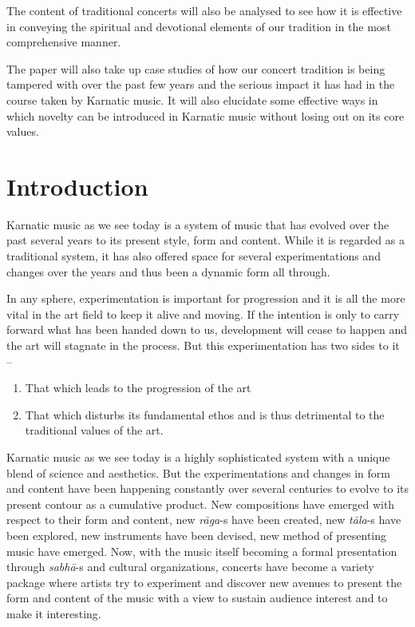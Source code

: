 The content of traditional concerts will also be analysed to see how it is effective in conveying the spiritual and devotional elements of our tradition in the most comprehensive manner.

The paper will also take up case studies of how our concert tradition is being tampered with over the past few years and the serious impact it has had in the course taken by Karnatic music. It will also elucidate some effective ways in which novelty can be introduced in Karnatic music without losing out on its core values.


\section*{Introduction}

Karnatic music as we see today is a system of music that has evolved over the past several years to its present style, form and content. While it is regarded as a traditional system, it has also offered space for several experimentations and changes over the years and thus been a dynamic form all through.

In any sphere, experimentation is important for progression and it is all the more vital in the art field to keep it alive and moving. If the intention is only to carry forward what has been handed down to us, development will cease to happen and the art will stagnate in the process. But this experimentation has two sides to it –

\vspace{-.3cm}

\begin{enumerate}
\itemsep=0pt
\item That which leads to the progression of the art

 \item That which disturbs its fundamental ethos and is thus detrimental to the traditional values of the art.

\end{enumerate}

\vspace{-.3cm}

Karnatic music as we see today is a highly sophisticated system with a unique blend of science and aesthetics. But the experimentations and changes in form and content have been happening constantly over several centuries to evolve to its present contour as a cumulative product. New compositions have emerged with respect to their form and content, new \textit{rāga}-s have been created, new \textit{tāla}-s have been explored, new instruments have been devised, new method of presenting music have emerged. Now, with the music itself becoming a formal presentation through \textit{sabhā}-s and cultural organizations, concerts have become a variety package where artists try to experiment and discover new avenues to present the form and content of the music with a view to sustain audience interest and to make it interesting.

